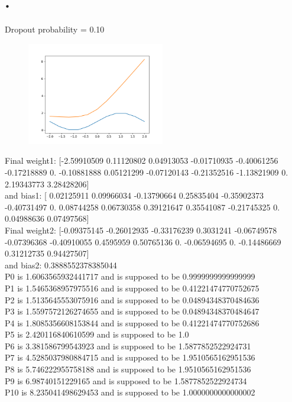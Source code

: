 \documentclass{article}
\begin{document}
\section{.}
Dropout probability = 0.10\\
\begin{figure}[htp]
    \centering
    \includegraphics[width=6cm]{photos/ask7_10.png}
    \label{fig:2}
\end{figure}
Final weight1: [-2.59910509  0.11120802  0.04913053 -0.01710935 -0.40061256 -0.17218889
  0.         -0.10881888  0.05121299 -0.07120143 -0.21352516 -1.13821909
  0.          2.19343773  3.28428206]\\ and bias1: [ 0.02125911  0.09966034 -0.13790664  0.25835404 -0.35902373 -0.40731497
  0.          0.08744258  0.06730358  0.39121647  0.35541087 -0.21745325
  0.          0.04988636  0.07497568]\\
Final weight2: [-0.09375145 -0.26012935 -0.33176239  0.3031241  -0.06749578 -0.07396368
 -0.40910055  0.4595959   0.50765136  0.         -0.06594695  0.
 -0.14486669  0.31212735  0.94427507]\\ and bias2: 0.3888552378385044\\
P0 is 1.6063565932441717 and is supposed to be 0.9999999999999999\\
P1 is 1.5465368957975516 and is supposed to be 0.41221474770752675\\
P2 is 1.5135645553075916 and is supposed to be 0.04894348370484636\\
P3 is 1.5597572126274655 and is supposed to be 0.04894348370484647\\
P4 is 1.8085356608153844 and is supposed to be 0.41221474770752686\\
P5 is 2.420116840610599 and is supposed to be 1.0\\
P6 is 3.381586799543923 and is supposed to be 1.5877852522924731\\
P7 is 4.5285037980884715 and is supposed to be 1.9510565162951536\\
P8 is 5.746222955758188 and is supposed to be 1.9510565162951536\\
P9 is 6.98740151229165 and is supposed to be 1.5877852522924734\\
P10 is 8.235041498629453 and is supposed to be 1.0000000000000002\\
\end{document}
